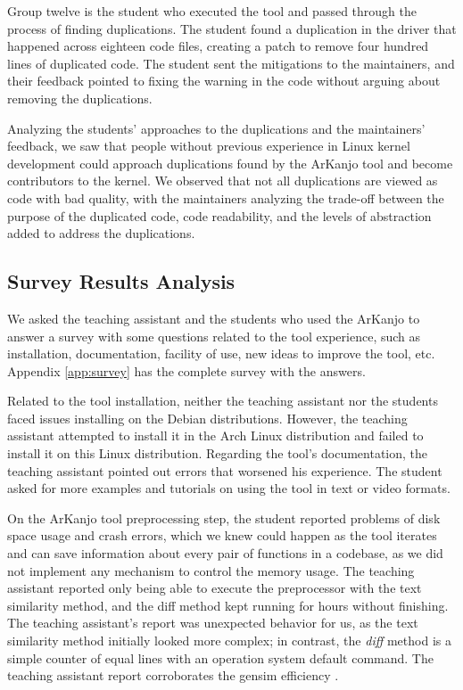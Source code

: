 Group twelve is the student who executed the tool and passed through the process of finding 
duplications. The student found a duplication in the driver that happened across eighteen code files, 
creating a patch to remove four hundred lines of duplicated code. The student sent the mitigations 
to the maintainers, and their feedback pointed to fixing the warning in the code without arguing 
about removing the duplications.

Analyzing the students' approaches to the duplications and the maintainers' feedback, we saw that 
people without previous experience in Linux kernel development could approach duplications found 
by the ArKanjo tool and become contributors to the kernel. We observed that not all duplications 
are viewed as code with bad quality, with the maintainers analyzing the trade-off between the 
purpose of the duplicated code, code readability, and the levels of abstraction added to 
address the duplications.

\subsection{Survey Results Analysis}

We asked the teaching assistant and the students who used the ArKanjo to answer a survey with 
some questions related to the tool experience, such as installation, documentation, facility of 
use, new ideas to improve the tool, etc. Appendix \ref{app:survey} has the complete survey 
with the answers.

Related to the tool installation, neither the teaching assistant nor the students faced issues 
installing on the Debian distributions. However, the teaching assistant attempted to install it 
in the Arch Linux distribution and failed to install it on this Linux distribution. 
Regarding the tool's documentation, the teaching assistant pointed out errors that worsened his 
experience. The student asked for more examples and tutorials on using the tool in text or 
video formats.

On the ArKanjo tool preprocessing step, the student reported problems of disk space usage and 
crash errors, which we knew could happen as the tool iterates and can save information about 
every pair of functions in a codebase, as we did not implement any mechanism to control the 
memory usage. The teaching assistant reported only being able to execute the preprocessor with 
the text similarity method, and the diff method kept running for hours without finishing. 
The teaching assistant's report was unexpected behavior for us, as the text similarity method 
initially looked more complex; in contrast, the \textit{diff} method is a simple counter of equal lines 
with an operation system default command. The teaching assistant report corroborates the 
gensim efficiency \citep{gensim}.


